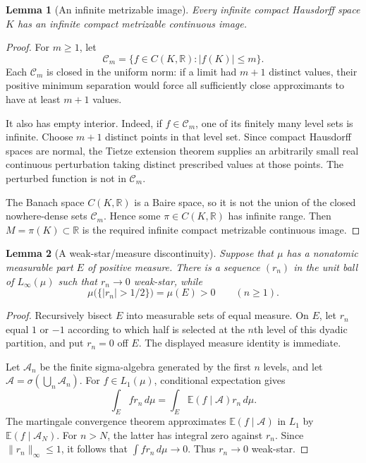 \documentclass[11pt]{article}
\newtheorem{lemma}{Lemma}
\newcommand{\Linfty}{L_\infty(\mu)}
\newcommand{\Lone}{L_1(\mu)}
\begin{document}
\begin{lemma}[An infinite metrizable image]\label{lem:image}
Every infinite compact Hausdorff space $K$ has an infinite compact metrizable
continuous image.
\end{lemma}

\begin{proof}
For $m\ge1$, let
\[
 \mathcal C_m=\{f\in C(K,\mathbb R): |f(K)|\le m\}.
\]
Each $\mathcal C_m$ is closed in the uniform norm: if a limit had $m+1$
distinct values, their positive minimum separation would force all
sufficiently close approximants to have at least $m+1$ values.

It also has empty interior.  Indeed, if $f\in\mathcal C_m$, one of its
finitely many level sets is infinite.  Choose $m+1$ distinct points in that
level set.  Since compact Hausdorff spaces are normal, the Tietze extension
theorem supplies an arbitrarily small real continuous perturbation taking
distinct prescribed values at those points.  The perturbed function is not
in $\mathcal C_m$.

The Banach space $C(K,\mathbb R)$ is a Baire space, so it is not the union of
the closed nowhere-dense sets $\mathcal C_m$.  Hence some
$\pi\in C(K,\mathbb R)$ has infinite range.  Then
$M=\pi(K)\subset\mathbb R$ is the required infinite compact metrizable
continuous image.
\end{proof}

\begin{lemma}[A weak-star/measure discontinuity]\label{lem:rademacher}
Suppose that $\mu$ has a nonatomic measurable part $E$ of positive measure.
There is a sequence $(r_n)$ in the unit ball of $\Linfty$ such that
$r_n\to0$ weak-star, while
\[
 \mu\bigl(\{|r_n|>1/2\}\bigr)=\mu(E)>0\qquad(n\ge1).
\]
\end{lemma}

\begin{proof}
Recursively bisect $E$ into measurable sets of equal measure.  On $E$, let
$r_n$ equal $1$ or $-1$ according to which half is selected at the $n$th
level of this dyadic partition, and put $r_n=0$ off $E$.  The displayed
measure identity is immediate.

Let $\mathcal A_n$ be the finite sigma-algebra generated by the first $n$
levels, and let $\mathcal A=\sigma(\bigcup_n\mathcal A_n)$.  For
$f\in\Lone$, conditional expectation gives
\[
 \int_E fr_n\,d\mu
 =\int_E \mathbb E(f\mid\mathcal A)r_n\,d\mu.
\]
The martingale convergence theorem approximates
$\mathbb E(f\mid\mathcal A)$ in $L_1$ by
$\mathbb E(f\mid\mathcal A_N)$.  For $n>N$, the latter has integral zero
against $r_n$.  Since $\|r_n\|_\infty\le1$, it follows that
$\int fr_n\,d\mu\to0$.  Thus $r_n\to0$ weak-star.
\end{proof}
\end{document}
